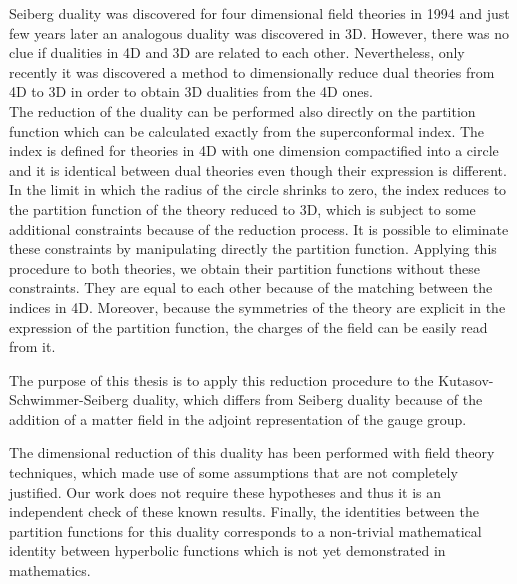 \documentclass[a4paper,11pt]{article}
\begin{document}
Seiberg duality was discovered for four dimensional field theories in 1994 and just few years later an analogous duality was discovered in 3D.
However, there was no clue if dualities in 4D and 3D are related to each other.
Nevertheless, only recently it was discovered a method to dimensionally reduce dual theories from 4D to 3D in order to obtain 3D dualities from the 4D ones.\\
The reduction of the duality can be performed also directly on the partition function which can be calculated exactly from the superconformal index. 
The index is defined for theories in 4D with one dimension compactified into a circle and it is identical between dual theories even though their expression is different.
In the limit in which the radius of the circle shrinks to zero, the index reduces to the partition function of the theory reduced to 3D, which is subject to some additional constraints because of the reduction process.
It is possible to eliminate these constraints by manipulating directly the partition function.
Applying this procedure to both theories, we obtain their partition functions without these constraints. 
They are equal to each other because of the matching between the indices in 4D.
Moreover, because the symmetries of the theory are explicit in the expression of the partition function, the charges of the field can be easily read from it.

The purpose of this thesis is to apply this reduction procedure to the Kutasov-Schwimmer-Seiberg duality, which differs from Seiberg duality because of the addition of a matter field in the adjoint representation of the gauge group.

The dimensional reduction of this duality has been performed with field theory techniques, which made use of some assumptions that are not completely justified.
Our work does not require these hypotheses and thus it is an independent check of these known results.
Finally, the identities between the partition functions for this duality corresponds to a non-trivial mathematical identity between hyperbolic functions which is not yet demonstrated in mathematics.
\end{document}

